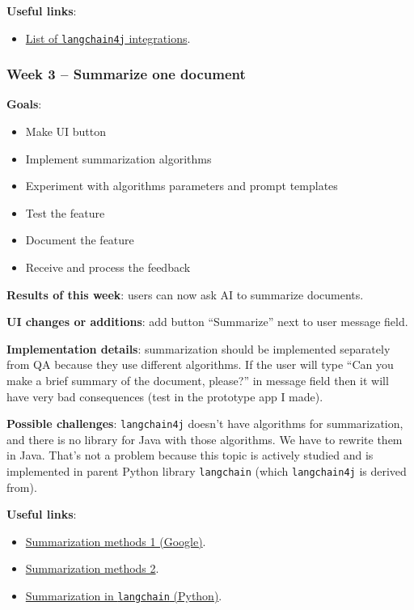 \documentclass{article}
\begin{document}
	\textbf{Useful links}:
	\begin{itemize}
		\item \href{https://docs.langchain4j.dev/category/language-models}{List of \texttt{langchain4j} integrations}.
	\end{itemize}

	\subsubsection{Week 3 -- Summarize one document}
		\textbf{Goals}:
		\begin{itemize}
			\item Make UI button
			\item Implement summarization algorithms
			\item Experiment with algorithms parameters and prompt templates
			\item Test the feature
			\item Document the feature
			\item Receive and process the feedback
		\end{itemize}
		
		\textbf{Results of this week}: users can now ask AI to summarize documents.
		
		\textbf{UI changes or additions}: add button \enquote{Summarize} next to user message field.
		
		\textbf{Implementation details}: summarization should be implemented separately from QA because they use different algorithms. If the user will type \enquote{Can you make a brief summary of the document, please?} in message field then it will have very bad consequences (test in the prototype app I made).
		
		\textbf{Possible challenges}: \texttt{langchain4j} doesn't have algorithms for summarization, and there is no library for Java with those algorithms. We have to rewrite them in Java. That's not a problem because this topic is actively studied and is implemented in parent Python library \texttt{langchain} (which \texttt{langchain4j} is derived from).
		
		\textbf{Useful links}:
		\begin{itemize}
			\item \href{https://github.com/GoogleCloudPlatform/generative-ai/blob/main/language/use-cases/document-summarization/summarization_large_documents_langchain.ipynb}{Summarization methods 1 (Google)}.
			\item \href{https://github.com/gkamradt/langchain-tutorials/blob/main/data_generation/5%20Levels%20Of%20Summarization%20-%20Novice%20To%20Expert.ipynb}{Summarization methods 2}.
			\item \href{https://python.langchain.com/docs/use_cases/summarization}{Summarization in \texttt{langchain} (Python)}.
		\end{itemize}
	
\end{document}
